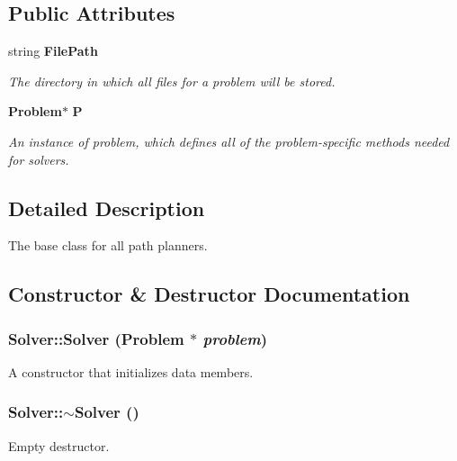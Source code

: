 \subsection*{Public Attributes}
\begin{CompactItemize}
\item 
string {\bf File\-Path}
\begin{CompactList}\small\item\em The directory in which all files for a problem will be stored.\item\end{CompactList}\item 
{\bf Problem}$\ast$ {\bf P}
\begin{CompactList}\small\item\em An instance of problem, which defines all of the problem-specific methods needed for solvers.\item\end{CompactList}\end{CompactItemize}


\subsection{Detailed Description}
The base class for all path planners.



\subsection{Constructor \& Destructor Documentation}
\subsubsection{\setlength{\rightskip}{0pt plus 5cm}Solver::Solver ({\bf Problem} $\ast$ {\em problem})}\label{class_Solver_a0}


A constructor that initializes data members.

\subsubsection{\setlength{\rightskip}{0pt plus 5cm}Solver::$\sim$Solver ()\hspace{0.3cm}{\tt  [inline, virtual]}}\label{class_Solver_a1}


Empty destructor.



